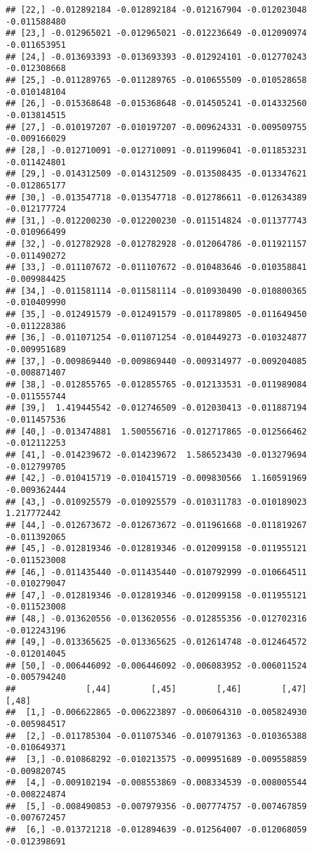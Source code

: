\documentclass[
]{article}
\begin{document}
\begin{verbatim}
## [22,] -0.012892184 -0.012892184 -0.012167904 -0.012023048 -0.011588480
## [23,] -0.012965021 -0.012965021 -0.012236649 -0.012090974 -0.011653951
## [24,] -0.013693393 -0.013693393 -0.012924101 -0.012770243 -0.012308668
## [25,] -0.011289765 -0.011289765 -0.010655509 -0.010528658 -0.010148104
## [26,] -0.015368648 -0.015368648 -0.014505241 -0.014332560 -0.013814515
## [27,] -0.010197207 -0.010197207 -0.009624331 -0.009509755 -0.009166029
## [28,] -0.012710091 -0.012710091 -0.011996041 -0.011853231 -0.011424801
## [29,] -0.014312509 -0.014312509 -0.013508435 -0.013347621 -0.012865177
## [30,] -0.013547718 -0.013547718 -0.012786611 -0.012634389 -0.012177724
## [31,] -0.012200230 -0.012200230 -0.011514824 -0.011377743 -0.010966499
## [32,] -0.012782928 -0.012782928 -0.012064786 -0.011921157 -0.011490272
## [33,] -0.011107672 -0.011107672 -0.010483646 -0.010358841 -0.009984425
## [34,] -0.011581114 -0.011581114 -0.010930490 -0.010800365 -0.010409990
## [35,] -0.012491579 -0.012491579 -0.011789805 -0.011649450 -0.011228386
## [36,] -0.011071254 -0.011071254 -0.010449273 -0.010324877 -0.009951689
## [37,] -0.009869440 -0.009869440 -0.009314977 -0.009204085 -0.008871407
## [38,] -0.012855765 -0.012855765 -0.012133531 -0.011989084 -0.011555744
## [39,]  1.419445542 -0.012746509 -0.012030413 -0.011887194 -0.011457536
## [40,] -0.013474881  1.500556716 -0.012717865 -0.012566462 -0.012112253
## [41,] -0.014239672 -0.014239672  1.586523430 -0.013279694 -0.012799705
## [42,] -0.010415719 -0.010415719 -0.009830566  1.160591969 -0.009362444
## [43,] -0.010925579 -0.010925579 -0.010311783 -0.010189023  1.217772442
## [44,] -0.012673672 -0.012673672 -0.011961668 -0.011819267 -0.011392065
## [45,] -0.012819346 -0.012819346 -0.012099158 -0.011955121 -0.011523008
## [46,] -0.011435440 -0.011435440 -0.010792999 -0.010664511 -0.010279047
## [47,] -0.012819346 -0.012819346 -0.012099158 -0.011955121 -0.011523008
## [48,] -0.013620556 -0.013620556 -0.012855356 -0.012702316 -0.012243196
## [49,] -0.013365625 -0.013365625 -0.012614748 -0.012464572 -0.012014045
## [50,] -0.006446092 -0.006446092 -0.006083952 -0.006011524 -0.005794240
##              [,44]        [,45]        [,46]        [,47]        [,48]
##  [1,] -0.006622865 -0.006223897 -0.006064310 -0.005824930 -0.005984517
##  [2,] -0.011785304 -0.011075346 -0.010791363 -0.010365388 -0.010649371
##  [3,] -0.010868292 -0.010213575 -0.009951689 -0.009558859 -0.009820745
##  [4,] -0.009102194 -0.008553869 -0.008334539 -0.008005544 -0.008224874
##  [5,] -0.008490853 -0.007979356 -0.007774757 -0.007467859 -0.007672457
##  [6,] -0.013721218 -0.012894639 -0.012564007 -0.012068059 -0.012398691

\end{verbatim}
\end{document}
